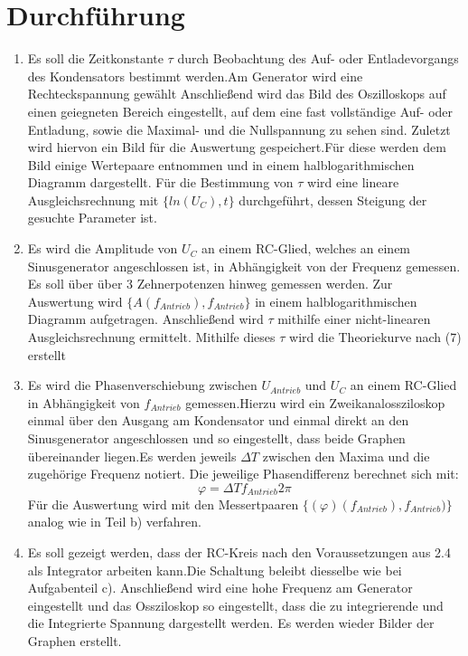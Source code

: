 \section{Durchführung}
\label{sec:Durchführung}
\renewcommand{\labelenumi}{\alph{enumi})}
\begin{enumerate}
  \item Es soll die Zeitkonstante $\tau$ durch Beobachtung des Auf- oder Entladevorgangs
  des Kondensators bestimmt werden.Am Generator wird eine Rechteckspannung gewählt
  Anschließend wird das Bild des Oszilloskops auf einen
  geiegneten Bereich eingestellt, auf dem eine fast vollständige Auf- oder Entladung, sowie
  die Maximal- und die Nullspannung zu sehen sind. Zuletzt wird hiervon ein Bild für die
  Auswertung gespeichert.Für diese werden dem Bild einige Wertepaare entnommen und in einem
  halblogarithmischen Diagramm dargestellt. Für die Bestimmung von $\tau$ wird eine
  lineare Ausgleichsrechnung mit $\{ln(U_C), t\}$ durchgeführt, dessen Steigung der gesuchte
  Parameter ist.

  \item Es wird die Amplitude von $U_C$ an einem RC-Glied, welches an einem Sinusgenerator
   angeschlossen ist, in Abhängigkeit von der Frequenz gemessen. Es soll über über
   3 Zehnerpotenzen hinweg gemessen werden. Zur Auswertung wird $\{A(f_{Antrieb}), f_{Antrieb}\}$
   in einem halblogarithmischen Diagramm aufgetragen. Anschließend wird $\tau$ mithilfe einer nicht-linearen
    Ausgleichsrechnung ermittelt. Mithilfe dieses $\tau$ wird die Theoriekurve nach (7) erstellt



    \item Es wird die Phasenverschiebung zwischen $U_{Antrieb}$ und $U_C$ an einem
    RC-Glied in Abhängigkeit von $f_{Antrieb}$ gemessen.Hierzu wird ein Zweikanalossziloskop
    einmal über den Ausgang am Kondensator und einmal direkt an den Sinusgenerator angeschlossen
     und so eingestellt, dass beide Graphen übereinander liegen.Es werden jeweils
      $\Delta T$ zwischen den Maxima und die zugehörige Frequenz notiert. Die jeweilige
       Phasendifferenz berechnet sich mit:
       \begin{equation}
         \varphi = \Delta Tf_{Antrieb} 2 \pi
       \end{equation}
       Für die Auswertung wird mit den Messertpaaren $\{(\varphi)(f_{Antrieb}),f_{Antrieb})\}$
       analog wie in Teil b) verfahren.

       \item Es soll gezeigt werden, dass der RC-Kreis nach den Voraussetzungen aus 2.4 als
       Integrator arbeiten kann.Die Schaltung beleibt diesselbe wie bei Aufgabenteil c).
       Anschließend wird eine hohe Frequenz am Generator eingestellt und das Ossziloskop so eingestellt, dass
       die zu integrierende und die Integrierte Spannung dargestellt werden. Es werden wieder
       Bilder der Graphen erstellt.


\end{enumerate}
